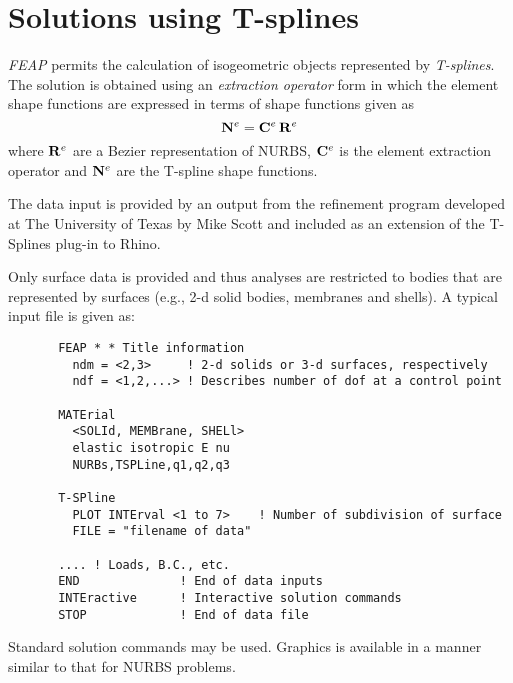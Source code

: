 \section{Solutions using T-splines}

\textsl{FEAP} permits the calculation of isogeometric objects represented by
\textit{T-splines}.  The solution is obtained using an \textit{extraction
operator} form in which the element shape functions are expressed in terms
of shape functions given as
\begin{displaymath}
\mathbf{N}^e = \mathbf{C}^e \, \mathbf{R}^e
\end{displaymath}
where $\mathbf{R}^e$ are a Bezier representation of NURBS, $\mathbf{C}^e$ is the element
extraction operator and $\mathbf{N}^e$ are the T-spline shape functions.

The data input is provided by an output from the refinement program
developed at The University of Texas by Mike Scott
and included as an extension
of the T-Splines plug-in to Rhino.  

Only surface data is provided and thus analyses are restricted to bodies that
are represented by surfaces (e.g., 2-d solid bodies, membranes and shells).  A
typical input file is given as:
\begin{verbatim}
       FEAP * * Title information
         ndm = <2,3>     ! 2-d solids or 3-d surfaces, respectively
         ndf = <1,2,...> ! Describes number of dof at a control point

       MATErial
         <SOLId, MEMBrane, SHELl>
         elastic isotropic E nu
         NURBs,TSPLine,q1,q2,q3

       T-SPline
         PLOT INTErval <1 to 7>    ! Number of subdivision of surface
         FILE = "filename of data"

       .... ! Loads, B.C., etc.
       END              ! End of data inputs
       INTEractive      ! Interactive solution commands
       STOP             ! End of data file
\end{verbatim}

Standard solution commands may be used.  Graphics is available in a manner
similar to that for NURBS problems.
